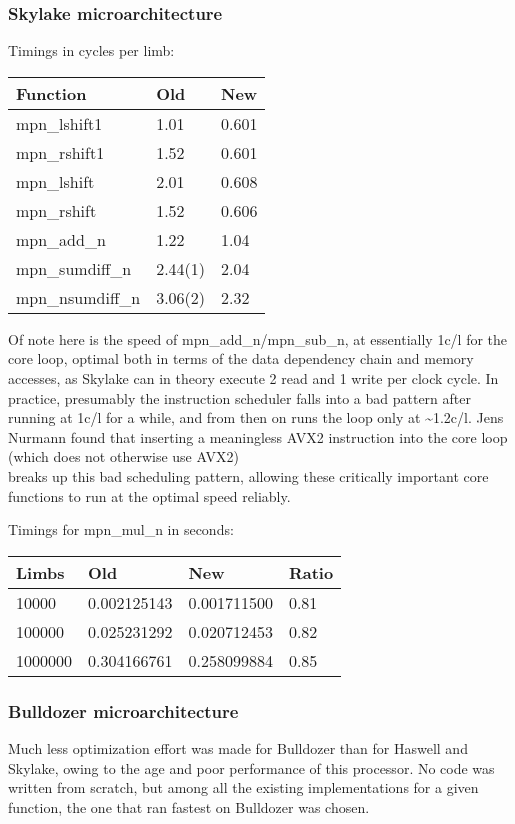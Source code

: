 \subsubsection{Skylake
microarchitecture}\label{skylake-microarchitecture}

Timings in cycles per limb:

\begin{longtable}[c]{@{}lll@{}}
\toprule
Function & Old & New\tabularnewline
\midrule
\endhead
mpn\_lshift1 & 1.01 & 0.601\tabularnewline
mpn\_rshift1 & 1.52 & 0.601\tabularnewline
mpn\_lshift & 2.01 & 0.608\tabularnewline
mpn\_rshift & 1.52 & 0.606\tabularnewline
mpn\_add\_n & 1.22 & 1.04\tabularnewline
mpn\_sumdiff\_n & 2.44(1) & 2.04\tabularnewline
mpn\_nsumdiff\_n & 3.06(2) & 2.32\tabularnewline
\bottomrule
\end{longtable}

Of note here is the speed of mpn\_add\_n/mpn\_sub\_n, at essentially
1c/l for the core loop, optimal both in terms of the data dependency
chain and memory accesses, as Skylake can in theory execute 2 read and 1
write per clock cycle. In practice, presumably the instruction scheduler
falls into a bad pattern after running at 1c/l for a while, and from
then on runs the loop only at \textasciitilde{}1.2c/l. Jens Nurmann
found that inserting a meaningless AVX2 instruction into the core loop
(which does not otherwise use AVX2)\\
breaks up this bad scheduling pattern, allowing these critically
important core functions to run at the optimal speed reliably.

Timings for mpn\_mul\_n in seconds:

\begin{longtable}[c]{@{}llll@{}}
\toprule
Limbs & Old & New & Ratio\tabularnewline
\midrule
\endhead
10000 & 0.002125143 & 0.001711500 & 0.81\tabularnewline
100000 & 0.025231292 & 0.020712453 & 0.82\tabularnewline
1000000 & 0.304166761 & 0.258099884 & 0.85\tabularnewline
\bottomrule
\end{longtable}

\subsubsection{Bulldozer
microarchitecture}\label{bulldozer-microarchitecture}

Much less optimization effort was made for Bulldozer than for Haswell
and Skylake, owing to the age and poor performance of this processor. No
code was written from scratch, but among all the existing
implementations for a given function, the one that ran fastest on
Bulldozer was chosen.

